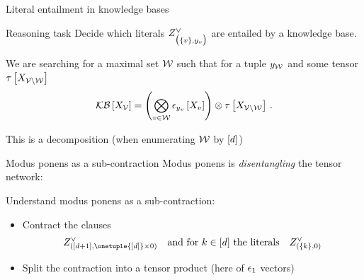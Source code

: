 \documentclass{beamer}
\begin{document}
    \begin{frame}{Literal entailment in knowledge bases}
        \begin{block}{Reasoning task}
            Decide which literals $Z^{\lor}_{\big(\{v\},y_{v}\big)}$ are entailed by a knowledge base.
        \end{block}

        We are searching for a maximal set $\mathcal{W}$ such that for a tuple $y_{\mathcal{W}}$ and some tensor $\tau\left[X_{\mathcal{V}\backslash\mathcal{W}}\right]$
        \begin{align*}
            \mathcal{KB}\left[X_{\mathcal{V}}\right]
            = \left(\bigotimes_{v\in\mathcal{W}} \epsilon_{y_{v}}\left[X_{v}\right]\right)
            \otimes \tau\left[X_{\mathcal{V}\backslash\mathcal{W}}\right] \, .
        \end{align*}

        This is a decomposition (when enumerating $\mathcal{W}$ by $[d]$)
        
    \end{frame}


    \begin{frame}{Modus ponens as a sub-contraction}
        Modus ponens is \emph{disentangling} the tensor network:
        
        Understand modus ponens as a sub-contraction:
        \begin{itemize}
            \item Contract the clauses
            \begin{align*}
                \clauseof{([\catorder+1],\onetuple{[\catorder]}\times 0)}
                \quad \text{and for $\catenumerator\in[\catorder]$ the literals} \quad \clauseof{(\{\catenumerator\},0)}
            \end{align*}
            \item Split the contraction into a tensor product (here of $\epsilon_{1}$ vectors)
        \end{itemize}

    \end{frame}
\end{document}
